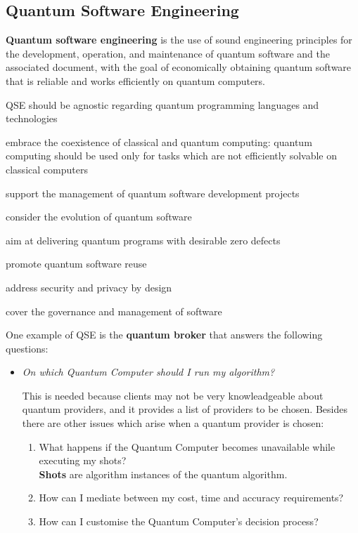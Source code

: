 \subsection{Quantum Software Engineering}
\textbf{Quantum software engineering} is the use of sound engineering principles for the development, operation, and maintenance of quantum software and the associated document, with the goal of economically obtaining  quantum software that is reliable and works efficiently on quantum computers.
\begin{itemize}
   \item QSE should be agnostic regarding quantum programming languages and technologies
   \item embrace the coexistence of classical and quantum computing:
   quantum computing should be used only for tasks which are not efficiently solvable on classical computers
   {
   \tiny\color{gray}
      \item support the management of quantum software development projects
      \item consider the evolution of quantum software
      \item aim at delivering quantum programs with desirable zero defects
      \item promote quantum software reuse
      \item address security and privacy by design
      \item cover the governance and management of software
   }
\end{itemize}
One example of QSE is the \textbf{quantum broker} that answers the following questions:
\begin{itemize}
   \item
   \begin{center}
      \textit{On which Quantum Computer should I run my algorithm?}
   \end{center}
   This is needed because clients may not be very knowleadgeable about quantum providers, and it provides a list of providers to be chosen.
   Besides there are other issues which arise when a quantum provider is chosen:
   \begin{enumerate}
      \item What happens if the Quantum Computer becomes unavailable while executing my shots?\\
      \textbf{Shots} are algorithm instances of the quantum algorithm.
      \item How can I mediate between my cost, time and accuracy requirements?
      \item How can I customise the Quantum Computer’s decision process?
   \end{enumerate}
\end{itemize}


